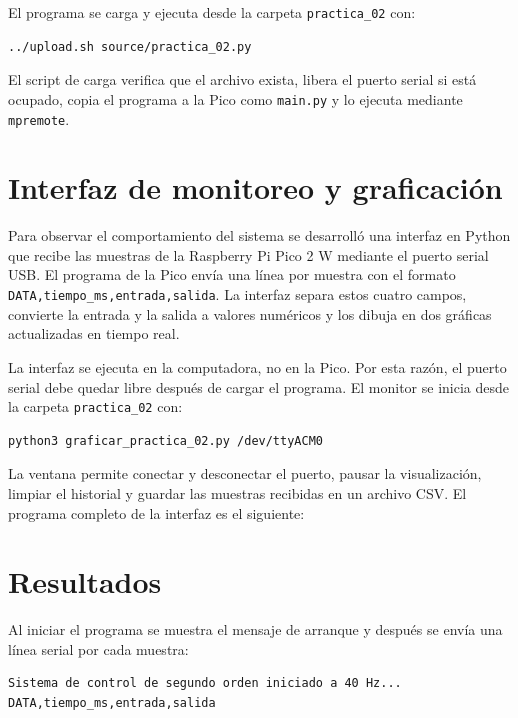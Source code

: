 \documentclass[12pt, letterpaper]{article}
\begin{document}
El programa se carga y ejecuta desde la carpeta \texttt{practica\_02} con:
\begin{lstlisting}[style=bashstyle]
../upload.sh source/practica_02.py
\end{lstlisting}

El script de carga verifica que el archivo exista, libera el puerto serial si
está ocupado, copia el programa a la Pico como \texttt{main.py} y lo ejecuta
mediante \texttt{mpremote}.



\section{Interfaz de monitoreo y graficación}

Para observar el comportamiento del sistema se desarrolló una interfaz en
Python que recibe las muestras de la Raspberry Pi Pico 2 W mediante el puerto
serial USB. El programa de la Pico envía una línea por muestra con el formato
\texttt{DATA,tiempo\_ms,entrada,salida}. La interfaz separa estos cuatro
campos, convierte la entrada y la salida a valores numéricos y los dibuja en
dos gráficas actualizadas en tiempo real.

La interfaz se ejecuta en la computadora, no en la Pico. Por esta razón, el
puerto serial debe quedar libre después de cargar el programa. El monitor se
inicia desde la carpeta \texttt{practica\_02} con:

\begin{lstlisting}[style=bashstyle]
python3 graficar_practica_02.py /dev/ttyACM0
\end{lstlisting}

La ventana permite conectar y desconectar el puerto, pausar la visualización,
limpiar el historial y guardar las muestras recibidas en un archivo CSV. El
programa completo de la interfaz es el siguiente:



\section{Resultados}

Al iniciar el programa se muestra el mensaje de arranque y después se envía una
línea serial por cada muestra:
\begin{lstlisting}[style=bashstyle]
Sistema de control de segundo orden iniciado a 40 Hz...
DATA,tiempo_ms,entrada,salida
\end{lstlisting}
\end{document}
